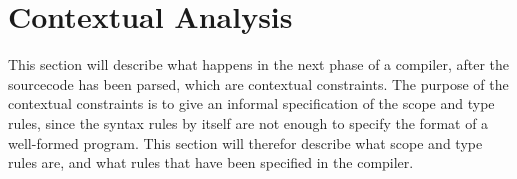 \section{Contextual Analysis} \label{chap:contextual_analysis}

This section will describe what happens in the next phase of a compiler, 
after the sourcecode has been parsed, which are contextual constraints.
The purpose of the contextual constraints is to give an informal 
specification of the scope and type rules, since the syntax rules by itself
are not enough to specify the format of a well-formed program. This section
will therefor describe what scope and type rules are, and what rules that have 
been specified in the compiler.
